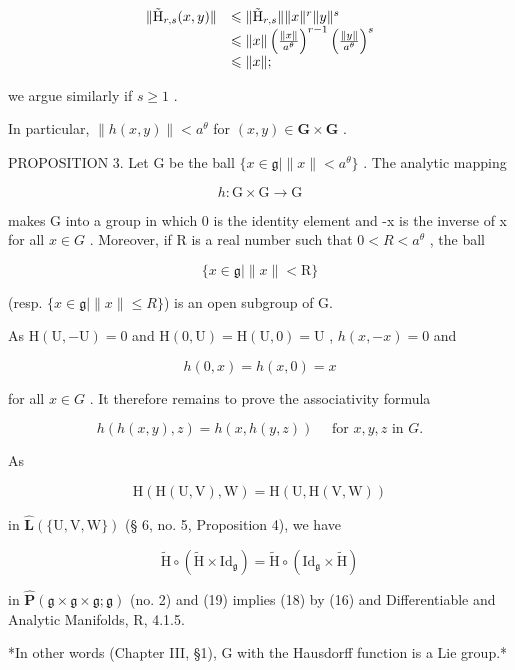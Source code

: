 \[
\begin{array}{r l} \| \tilde {\mathrm{H}} _ {r, s} (x, y) \| & \leqslant \| \tilde {\mathrm{H}} _ {r, s} \| \| x \| ^ {r} \| y \| ^ {s} \\ & \leqslant \| x \| \left(\frac {\| x \|}{a ^ {\theta}}\right) ^ {r - 1} \left(\frac {\| y \|}{a ^ {\theta}}\right) ^ {s} \\ & \leqslant \| x \|; \end{array}
\]

we argue similarly if \(s \geqslant 1\) .

In particular, \(\| h(x,y)\| < a^{\theta}\) for \((x,y)\in \mathbf{G}\times \mathbf{G}\) .

PROPOSITION 3. Let G be the ball \(\{x\in\mathfrak{g}\mid\|x\|<a^{\theta}\}\) . The analytic mapping

\[
h \colon \mathrm{G} \times \mathrm{G} \rightarrow \mathrm{G}
\]

makes G into a group in which 0 is the identity element and -x is the inverse of x for all \(x \in G\) . Moreover, if R is a real number such that \(0 < R < a^{\theta}\) , the ball

\[
\{x \in \mathfrak {g} | \| x \| <   \mathrm{R} \}
\]

(resp. \(\{x \in \mathfrak{g} \mid \|x\| \leqslant R\}\)) is an open subgroup of G.

As \(\mathrm{H}(\mathrm{U}, -\mathrm{U}) = 0\) and \(\mathrm{H}(0, \mathrm{U}) = \mathrm{H}(\mathrm{U}, 0) = \mathrm{U}\) , \(h(x, -x) = 0\) and

\[
h (0, x) = h (x, 0) = x
\]

for all \(x \in G\) . It therefore remains to prove the associativity formula

\[
h (h (x, y), z) = h (x, h (y, z)) \quad \text { for } x, y, z \text { in } G.\tag{18}
\]

As

\[
\mathrm{H} (\mathrm{H} (\mathrm{U}, \mathrm{V}), \mathrm{W}) = \mathrm{H} (\mathrm{U}, \mathrm{H} (\mathrm{V}, \mathrm{W}))
\]

in \(\hat{\mathbf{L}} (\{\mathrm{U},\mathrm{V},\mathrm{W}\})\) (§ 6, no. 5, Proposition 4), we have

\[
\tilde {\mathrm{H}} \circ (\tilde {\mathrm{H}} \times \mathrm{Id} _ {\mathfrak {g}}) = \tilde {\mathrm{H}} \circ (\mathrm{Id} _ {\mathfrak {g}} \times \tilde {\mathrm{H}})\tag{19}
\]

in \(\hat{\mathbf{P}} (\mathfrak{g}\times \mathfrak{g}\times \mathfrak{g};\mathfrak{g})\) (no. 2) and (19) implies (18) by (16) and Differentiable and Analytic Manifolds, R, 4.1.5.

*In other words (Chapter III, §1), G with the Hausdorff function is a Lie group.*

